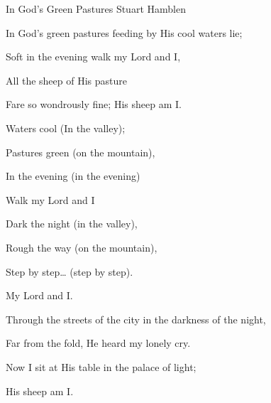 \documentclass[12pt]{book}
\begin{document}
\begin{song}{In God's Green Pastures}{}
  {}
  {Stuart Hamblen}
  {}
  {}

  \begin{SBVerse}
    In God’s green pastures feeding by His cool waters lie;

    Soft in the evening walk my Lord and I,

    All the sheep of His pasture

    Fare so wondrously fine; His sheep am I.
  \end{SBVerse}

  \begin{SBOpGroup}
    Waters cool (In the valley);

    Pastures green (on the mountain),

    In the evening (in the evening)

    Walk my Lord and I
  \end{SBOpGroup}

  \begin{SBOpGroup}
    Dark the night (in the valley),

    Rough the way (on the mountain),

    Step by step… (step by step).

    My Lord and I.
  \end{SBOpGroup}

  \begin{SBVerse}
    Through the streets of the city in the darkness of the night,

    Far from the fold, He heard my lonely cry.

    Now I sit at His table in the palace of light;

    His sheep am I.
  \end{SBVerse}
\end{song}
\end{document}
